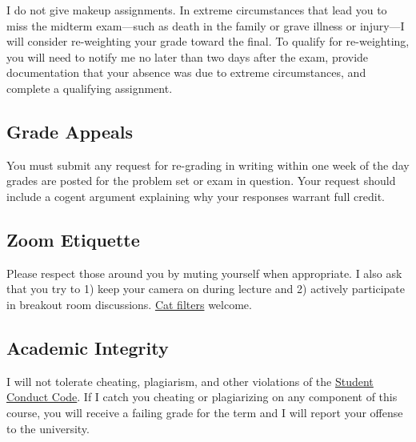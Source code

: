 \documentclass[11pt]{article}
\begin{document}
I do not give makeup assignments. In extreme circumstances that lead you to miss the midterm exam---such as death in the family or grave illness or injury---I will consider re-weighting your grade toward the final. To qualify for re-weighting, you will need to notify me no later than two days after the exam, provide documentation that your absence was due to extreme circumstances, and complete a qualifying assignment.

\subsection*{Grade Appeals} 

You must submit any request for re-grading in writing within one week of the day grades are posted for the problem set or exam in question. Your request should include a cogent argument explaining why your responses warrant full credit.

\subsection*{Zoom Etiquette} 

Please respect those around you by muting yourself when appropriate. I also ask that you try to 1) keep your camera on during lecture and 2) actively participate in breakout room discussions. \href{https://www.youtube.com/watch?v=TDNP-SWgn2w}{Cat filters} welcome. 


\subsection*{Academic Integrity} 

I will not tolerate cheating, plagiarism, and other violations of the \href{https://studentlife.uoregon.edu/conduct}{Student Conduct Code}. If I catch you cheating or plagiarizing on any component of this course, you will receive a failing grade for the term and I will report your offense to the university. 
\end{document}
